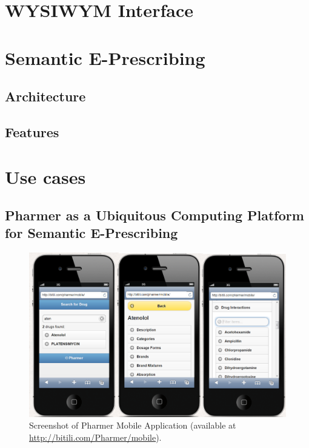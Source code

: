 \documentclass[journal]{IEEEtran}
\begin{document}
\section{WYSIWYM Interface}
\label{sec:wysiwym}

\section{Semantic E-Prescribing}
\label{sec:sep}

\subsection{Architecture}

\subsection{Features}

\section{Use cases}
\label{sec:usecases}

\subsection{Pharmer as a Ubiquitous Computing Platform for Semantic E-Prescribing}
\label{sec:mobile}

\begin{figure}[tb]
 \centering
 \includegraphics[width=1.5\columnwidth]{images/sc_Pharmer.png}
	\caption{Screenshot of Pharmer Mobile Application (available at \url{http://bitili.com/Pharmer/mobile}).}
 \label{fig:mobile}
\end{figure}
\end{document}
